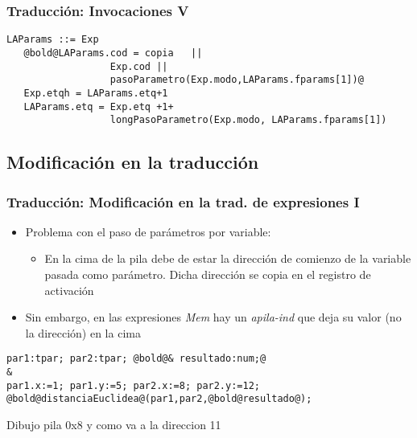 \documentclass[hyperref={pdfpagelabels=false},tree-dvips,compress]{beamer}
\begin{document}
\begin{frame}[fragile]
\frametitle{Traducción: Invocaciones V}


\begin{lstlisting}[style=gramaticas,basicstyle=\scriptsize\ttfamily,mathescape]
LAParams ::= Exp
   @bold@LAParams.cod = copia   ||
                  Exp.cod ||
                  pasoParametro(Exp.modo,LAParams.fparams[1])@
   Exp.etqh = LAParams.etq+1
   LAParams.etq = Exp.etq +1+
                  longPasoParametro(Exp.modo, LAParams.fparams[1])
\end{lstlisting}

\end{frame}
\subsection{Modificación en la traducción}
\begin{frame}[fragile]
\frametitle{Traducción: Modificación en la trad. de expresiones I}

\begin{itemize}
	\item Problema con el paso de parámetros por variable:
		\begin{itemize}
			\item En la cima de la pila debe de estar la dirección de comienzo de la variable pasada como parámetro. Dicha dirección se copia en el registro de activación
		\end{itemize}
	\item Sin embargo, en las expresiones \emph{Mem} hay un \emph{apila-ind} que deja su valor (no la dirección) en la cima
\end{itemize}

\begin{lstlisting}[style=codigo,basicstyle=\footnotesize\ttfamily]
par1:tpar; par2:tpar; @bold@& resultado:num;@
&
par1.x:=1; par1.y:=5; par2.x:=8; par2.y:=12;
@bold@distanciaEuclidea@(par1,par2,@bold@resultado@);
\end{lstlisting}

Dibujo pila 0x8 y como va a la direccion 11


\end{frame}
\end{document}
